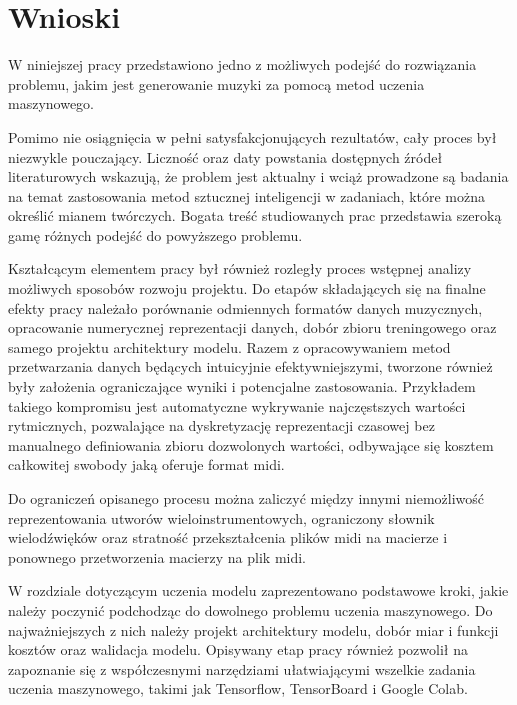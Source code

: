 \chapter{Wnioski}
{
    W\,\,niniejszej pracy przedstawiono jedno z\,\,możliwych podejść do rozwiązania problemu,
    jakim jest generowanie muzyki za pomocą metod uczenia maszynowego. 

    Pomimo nie osiągnięcia w\,\,pełni satysfakcjonujących rezultatów, cały proces był niezwykle pouczający. 
    Liczność oraz daty powstania dostępnych źródeł literaturowych wskazują, że problem jest aktualny 
    i\,\,wciąż prowadzone są badania na temat zastosowania metod sztucznej inteligencji w\,\,zadaniach, 
    które można określić mianem twórczych. Bogata treść studiowanych prac przedstawia szeroką gamę 
    różnych podejść do powyższego problemu.

    Kształcącym elementem pracy był również rozległy proces wstępnej analizy możliwych sposobów
    rozwoju projektu. Do etapów składających się na finalne efekty pracy należało porównanie odmiennych 
    formatów danych muzycznych, opracowanie numerycznej reprezentacji danych, dobór zbioru treningowego
    oraz samego projektu architektury modelu. 
    Razem z\,\,opracowywaniem metod przetwarzania danych będących intuicyjnie efektywniejszymi, tworzone również były założenia
    ograniczające wyniki i\,\,potencjalne zastosowania. Przykładem takiego kompromisu jest automatyczne wykrywanie
    najczęstszych wartości rytmicznych, pozwalające na dyskretyzację reprezentacji czasowej bez
    manualnego definiowania zbioru dozwolonych wartości, odbywające się kosztem całkowitej swobody jaką oferuje format midi.
    
    Do ograniczeń opisanego procesu można zaliczyć między innymi niemożliwość reprezentowania utworów wieloinstrumentowych, 
    ograniczony słownik wielodźwięków oraz stratność przekształcenia plików midi na macierze i\,\,ponownego przetworzenia
    macierzy na plik midi.

    W\,\,rozdziale dotyczącym uczenia modelu zaprezentowano podstawowe kroki, jakie należy poczynić podchodząc do
    dowolnego problemu uczenia maszynowego. Do najważniejszych z\,\,nich należy projekt architektury modelu,
    dobór miar i\,\,funkcji kosztów oraz walidacja modelu. Opisywany etap pracy również pozwolił na zapoznanie 
    się z\,\,współczesnymi narzędziami ułatwiającymi wszelkie zadania uczenia maszynowego, takimi jak Tensorflow, 
    TensorBoard i\,\,Google Colab. 

    \bigskip

}
